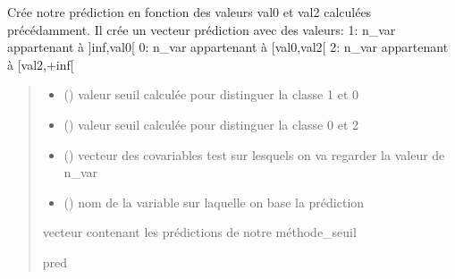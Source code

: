 \documentclass[letterpaper,10pt,french]{sphinxmanual}
\begin{document}
\begin{fulllineitems}
\label{\detokenize{methode_fait_maison:methode_fait_maison.predict}}
\pysigstartsignatures
{}
\pysigstopsignatures
\sphinxAtStartPar
Crée notre prédiction en fonction des valeurs val0 et val2 calculées précédamment.
Il crée un vecteur prédiction avec des valeurs:
\sphinxhyphen{} 1: n\_var appartenant à {]}\sphinxhyphen{}inf,val0{[}
\sphinxhyphen{} 0: n\_var appartenant à {[}val0,val2{[}
\sphinxhyphen{} 2: n\_var appartenant à {[}val2,+inf{[}
\begin{quote}\begin{description}
\begin{itemize}
\item {} 
\sphinxAtStartPar
{} () \textendash{} valeur seuil calculée pour distinguer la classe 1 et 0

\item {} 
\sphinxAtStartPar
{} () \textendash{} valeur seuil calculée pour distinguer la classe 0 et 2

\item {} 
\sphinxAtStartPar
{} () \textendash{} vecteur des covariables test sur lesquels on va regarder la valeur de n\_var

\item {} 
\sphinxAtStartPar
{} () \textendash{} nom de la variable sur laquelle on base la prédiction

\end{itemize}

\sphinxAtStartPar
vecteur contenant les prédictions de notre méthode\_seuil

\sphinxAtStartPar
pred

\end{description}\end{quote}

\end{fulllineitems}
\end{document}

